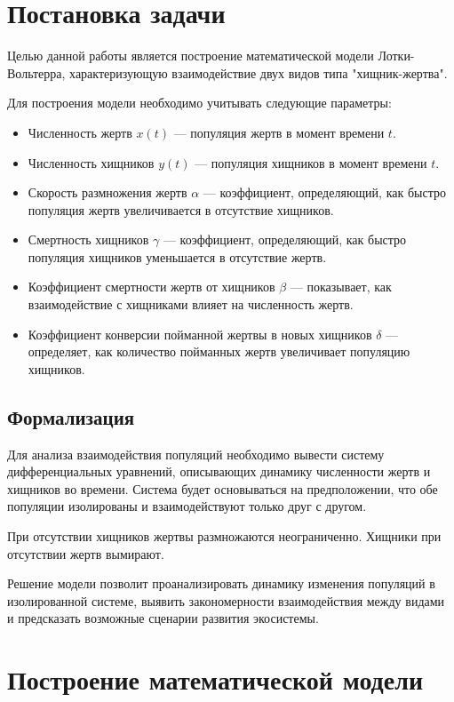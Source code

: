 \chapter{Постановка задачи}
Целью данной работы является построение математической модели Лотки-Вольтерра, характеризующую взаимодействие двух видов типа "хищник-жертва". 

Для построения модели необходимо учитывать следующие параметры:

\begin{itemize}
	\item Численность жертв \( x(t) \) — популяция жертв в момент времени \( t \).
	\item Численность хищников \( y(t) \) — популяция хищников в момент времени \( t \).
	\item Скорость размножения жертв \( \alpha \) — коэффициент, определяющий, как быстро популяция жертв увеличивается в отсутствие хищников.
	\item Смертность хищников \( \gamma \) — коэффициент, определяющий, как быстро популяция хищников уменьшается в отсутствие жертв.
	\item Коэффициент смертности жертв от хищников \( \beta \) — показывает, как взаимодействие с хищниками влияет на численность жертв.
	\item Коэффициент конверсии пойманной жертвы в новых хищников \( \delta \) — определяет, как количество пойманных жертв увеличивает популяцию хищников.
\end{itemize}

\section{Формализация}
Для анализа взаимодействия популяций необходимо вывести систему дифференциальных уравнений, описывающих динамику численности жертв и хищников во времени. Система будет основываться на предположении, что обе популяции изолированы и взаимодействуют только друг с другом.

При отсутствии хищников жертвы размножаются неограниченно.
Хищники при отсутствии жертв вымирают.


Решение модели позволит проанализировать динамику изменения популяций в изолированной системе, выявить закономерности взаимодействия между видами и предсказать возможные сценарии развития экосистемы.

\chapter{Построение математической модели}

